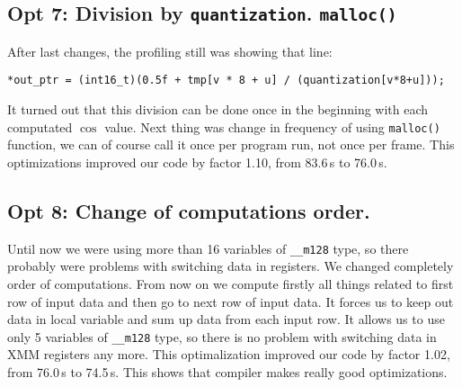 \documentclass[11pt]{article}
\begin{document}
\subsection{Opt 7: Division by \texttt{quantization}. \texttt{malloc()}}
After last changes, the profiling still was showing that line:
\begin{lstlisting}
*out_ptr = (int16_t)(0.5f + tmp[v * 8 + u] / (quantization[v*8+u]));
\end{lstlisting}
It turned out that this division can be done once in the beginning
with each computated $\cos$ value.
Next thing was change in frequency of using \texttt{malloc()} function,
we can of course call it once per program run, not once per frame.
This optimizations improved our code by factor 1.10, from 83.6\,s to 76.0\,s.

\subsection{Opt 8: Change of computations order.}
Until now we were using more than 16 variables of \texttt{\_\_m128} type,
so there probably were problems with switching data in registers.
We changed completely order of computations. From now on we compute
firstly all things related to first row of input data and then go
to next row of input data. It forces us to keep out data in local
variable and sum up data from each input row. It allows us to use
only 5 variables of \texttt{\_\_m128} type, so there is no problem with
switching data in XMM registers any more. This optimalization
improved our code by factor 1.02, from 76.0\,s to 74.5\,s. This shows
that compiler makes really good optimizations.
\end{document}
